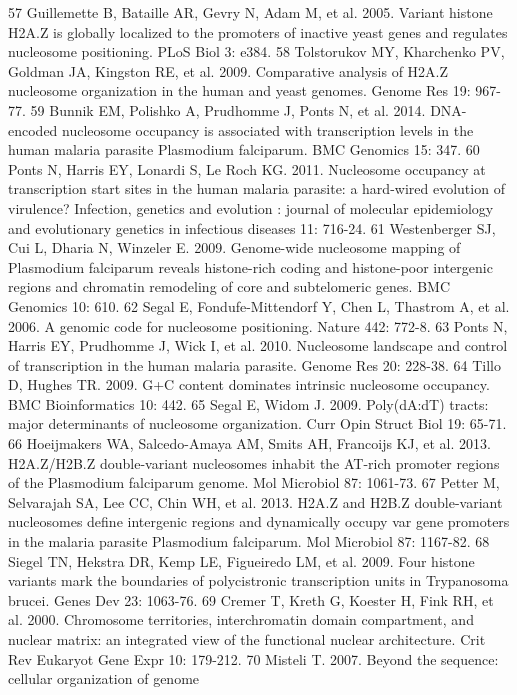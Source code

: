 57  Guillemette B, Bataille AR, Gevry N, Adam M, et al. 2005. Variant histone
H2A.Z is globally localized to the promoters of inactive yeast genes and
regulates nucleosome positioning. PLoS Biol 3: e384.
58  Tolstorukov MY, Kharchenko PV, Goldman JA, Kingston RE, et al. 2009.
Comparative analysis of H2A.Z nucleosome organization in the human and yeast
genomes. Genome Res 19: 967-77.
59  Bunnik EM, Polishko A, Prudhomme J, Ponts N, et al. 2014. DNA-encoded
nucleosome occupancy is associated with transcription levels in the human
malaria parasite Plasmodium falciparum. BMC Genomics 15: 347.
60  Ponts N, Harris EY, Lonardi S, Le Roch KG. 2011. Nucleosome occupancy at
transcription start sites in the human malaria parasite: a hard-wired
evolution of virulence? Infection, genetics and evolution : journal of
molecular epidemiology and evolutionary genetics in infectious diseases 11:
716-24.
61  Westenberger SJ, Cui L, Dharia N, Winzeler E. 2009. Genome-wide nucleosome
mapping of Plasmodium falciparum reveals histone-rich coding and histone-poor
intergenic regions and chromatin remodeling of core and subtelomeric genes.
BMC Genomics 10: 610.
62  Segal E, Fondufe-Mittendorf Y, Chen L, Thastrom A, et al. 2006. A genomic
code for nucleosome positioning. Nature 442: 772-8.
63  Ponts N, Harris EY, Prudhomme J, Wick I, et al. 2010. Nucleosome landscape
and control of transcription in the human malaria parasite. Genome Res 20:
228-38.
64  Tillo D, Hughes TR. 2009. G+C content dominates intrinsic nucleosome
occupancy. BMC Bioinformatics 10: 442.
65  Segal E, Widom J. 2009. Poly(dA:dT) tracts: major determinants of
nucleosome organization. Curr Opin Struct Biol 19: 65-71.
66  Hoeijmakers WA, Salcedo-Amaya AM, Smits AH, Francoijs KJ, et al. 2013.
H2A.Z/H2B.Z double-variant nucleosomes inhabit the AT-rich promoter regions of
the Plasmodium falciparum genome. Mol Microbiol 87: 1061-73.
67  Petter M, Selvarajah SA, Lee CC, Chin WH, et al. 2013. H2A.Z and H2B.Z
double-variant nucleosomes define intergenic regions and dynamically occupy
var gene promoters in the malaria parasite Plasmodium falciparum. Mol
Microbiol 87: 1167-82.
68  Siegel TN, Hekstra DR, Kemp LE, Figueiredo LM, et al. 2009. Four histone
variants mark the boundaries of polycistronic transcription units in
Trypanosoma brucei. Genes Dev 23: 1063-76.
69  Cremer T, Kreth G, Koester H, Fink RH, et al. 2000. Chromosome
territories, interchromatin domain compartment, and nuclear matrix: an
integrated view of the functional nuclear architecture. Crit Rev Eukaryot Gene
Expr 10: 179-212.
70  Misteli T. 2007. Beyond the sequence: cellular organization of genome
